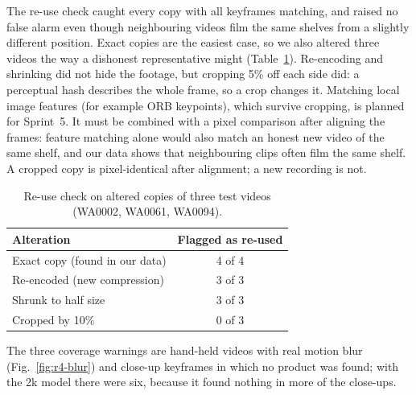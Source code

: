 The re-use check caught every copy with all keyframes matching, and raised no false alarm even
though neighbouring videos film the same shelves from a slightly different position. Exact copies
are the easiest case, so we also altered three videos the way a dishonest representative might
(Table~\ref{tab:r4-reuse}). Re-encoding and shrinking did not hide the footage, but cropping 5\% off
each side did: a perceptual hash describes the whole frame, so a crop changes it. Matching local
image features (for example ORB keypoints), which survive cropping, is planned for Sprint~5. It must
be combined with a pixel comparison after aligning the frames: feature matching alone would also
match an honest new video of the same shelf, and our data shows that neighbouring clips often film
the same shelf. A cropped copy is pixel-identical after alignment; a new recording is not.

\begin{table}[!t]
\centering
\caption{Re-use check on altered copies of three test videos (WA0002, WA0061, WA0094).}
\label{tab:r4-reuse}
\begin{tabular}{lc}
\hline
Alteration & Flagged as re-used \\
\hline
Exact copy (found in our data) & 4 of 4 \\
Re-encoded (new compression) & 3 of 3 \\
Shrunk to half size & 3 of 3 \\
Cropped by 10\% & 0 of 3 \\
\hline
\end{tabular}
\end{table}

The three coverage warnings are hand-held videos with real motion blur (Fig.~\ref{fig:r4-blur}) and
close-up keyframes in which no product was found; with the 2k model there were six, because it found
nothing in more of the close-ups.

